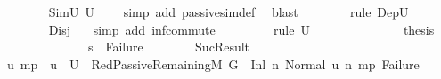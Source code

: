 \begin{isabellebody}
\ \ \ \ \ \ \isamarkupfalse%
\ SimU{}\ {\isacartoucheopen}U{}\ {\isasymnoteq}\ {\isacharbraceleft}{\kern0pt}{\isacharbraceright}{\kern0pt}{\isacartoucheclose}\ \isamarkupfalse%
\ {\isacharparenleft}{\kern0pt}simp\ add{\isacharcolon}{\kern0pt}\ passive{\isacharunderscore}{\kern0pt}sim{\isacharunderscore}{\kern0pt}def{\isacharparenright}{\kern0pt}\ \isamarkupfalse%
\ blast\isanewline
\ \ \ \ \ \ \isamarkupfalse%
\ {\isacharparenleft}{\kern0pt}rule\ DepU{}{\isacharparenright}{\kern0pt}\isanewline
\ \ \ \ \ \ \isamarkupfalse%
\ Disj\ \ \isamarkupfalse%
\ {\isacharparenleft}{\kern0pt}simp\ add{\isacharcolon}{\kern0pt}\ inf{\isacharunderscore}{\kern0pt}commute{\isacharparenright}{\kern0pt}\ \isanewline
\ \ \ \ \ \ \isamarkupfalse%
\ {\isacharparenleft}{\kern0pt}rule\ {\isacartoucheopen}U{}\ {\isasymnoteq}\ {\isacharbraceleft}{\kern0pt}{\isacharbraceright}{\kern0pt}{\isacartoucheclose}{\isacharparenright}{\kern0pt}\isanewline
\ \ \ \ \ \ \isamarkupfalse%
\isanewline
\ \ \ \ \isamarkupfalse%
\ {\isacharquery}{\kern0pt}thesis\isanewline
\ \ \ \ \isamarkupfalse%
\ \isanewline
\ \ \ \ \ \ \isamarkupfalse%
\ {\isachardoublequoteopen}s{\isacharprime}{\kern0pt}\ {\isacharequal}{\kern0pt}\ Failure{\isachardoublequoteclose}\isanewline
\ \ \ \ \ \ \isamarkupfalse%
\ SucResult\ \isamarkupfalse%
\ u\ m{\isacharunderscore}{\kern0pt}p{\isacharprime}{\kern0pt}\ \ {\isachardoublequoteopen}u\ {\isasymin}\ U{}{\isachardoublequoteclose}\ \ RedPassiveRemaining{\isacharcolon}{\kern0pt}{\isachardoublequoteopen}{\isacharparenleft}{\kern0pt}M{\isacharcomma}{\kern0pt}{\isasymLambda}{}{\isacharcomma}{\kern0pt}{\isasymGamma}{\isacharcomma}{\kern0pt}{\isasymOmega}{\isacharcomma}{\kern0pt}\ G{}\ {\isasymturnstile}\ {\isacharparenleft}{\kern0pt}{\isacharparenleft}{\kern0pt}Inl\ n{\isacharprime}{\kern0pt}{\isacharparenright}{\kern0pt}{\isacharcomma}{\kern0pt}\ Normal\ u{\isacharparenright}{\kern0pt}\ {\isacharminus}{\kern0pt}n{\isasymrightarrow}{\isacharasterisk}{\kern0pt}\ {\isacharparenleft}{\kern0pt}m{\isacharunderscore}{\kern0pt}p{\isacharprime}{\kern0pt}{\isacharcomma}{\kern0pt}\ Failure{\isacharparenright}{\kern0pt}{\isacharparenright}{\kern0pt}{\isachardoublequoteclose}\isanewline
\ \ \ \ \ \ \ \ \isamarkupfalse%

\end{isabellebody}
